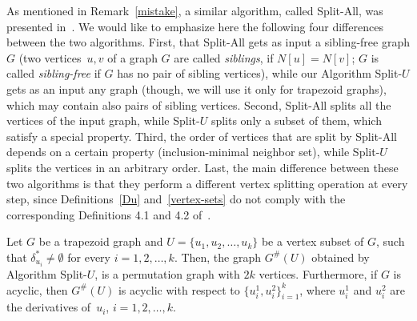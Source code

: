 \documentclass[proceedings]{stacs}
\begin{document}
\begin{algorithm}[t]
\caption{Split-$U$} \label{alg1}
\begin{algorithmic} 



\ENDFOR 
{}

\end{algorithmic}
\end{algorithm}

\begin{remark}
\label{mistake-2}As mentioned in Remark~\ref{mistake}, a similar algorithm,
called Split-All, was presented in~\cite{Cheah96}. We would like to
emphasize here the following four differences between the two algorithms.
First, that Split-All gets as input a sibling-free graph $G$ (two vertices~$u,v$ 
of a graph $G$ are called \emph{siblings}, if $N[u]=N[v]$; $G$ is
called \emph{sibling-free} if $G$ has no pair of sibling vertices), while
our Algorithm Split-$U$ gets as an input any graph (though, we will use it
only for trapezoid graphs), which may contain also pairs of sibling vertices.
Second, Split-All splits all the vertices of the input graph, while Split-$U$
splits only a subset of them, which satisfy a special property. Third, the
order of vertices that are split by Split-All depends on a certain property
(inclusion-minimal neighbor set), while Split-$U$ splits the vertices in an
arbitrary order. Last, the main difference between these two algorithms is
that they perform a different vertex splitting operation at every step,
since Definitions~\ref{Du} and~\ref{vertex-sets} do not comply with the
corresponding Definitions 4.1 and 4.2 of~\cite{Cheah96}.
\end{remark}

\begin{theorem}
\label{split} Let $G$ be a trapezoid graph and $U=\{u_{1},u_{2},\ldots
,u_{k}\}$ be a vertex subset of $G$, such that $\delta_{u_{i}}^{\ast }\neq
\emptyset $ for every $i=1,2,\ldots ,k$. Then, the graph $G^{\#}(U)$
obtained by Algorithm Split-$U$, is a permutation graph with $2k$ vertices.
Furthermore, if $G$ is acyclic, then $G^{\#}(U)$ is acyclic with respect to $%
\{u_{i}^{1},u_{i}^{2}\}_{i=1}^{k}$, where $u_{i}^{1}$ and $u_{i}^{2}$ are
the derivatives of~$u_{i}$, $i=1,2,\ldots ,k$.
\end{theorem}
\end{document}
